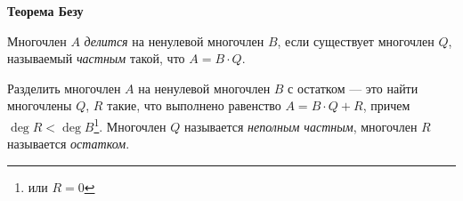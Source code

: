 \documentclass{article}
\begin{document}
    \large


    \begin{center}
        \textbf{Теорема Безу}
    \end{center}

    \begin{definition}
        Многочлен $A$ \textit{делится} на ненулевой многочлен $B$, если
        существует многочлен $Q$, называемый \textit{частным} такой, что $A=B\cdot Q$.
    \end{definition}


    \begin{definition}
        Разделить многочлен $A$ на ненулевой многочлен $B$ с
        остатком --- это найти многочлены $Q$, $R$ такие, что выполнено равенство
        $A=B\cdot Q+R$, причем $\deg R<\deg B$\footnote{ или $R=0$}.
        Многочлен $Q$ называется \textit{неполным частным}, многочлен $R$ называется \textit{остатком}.
    \end{definition}
\end{document}
